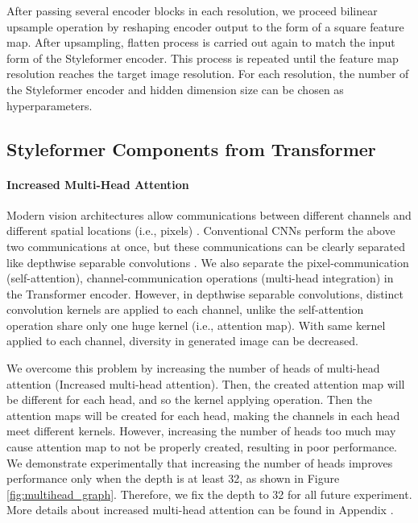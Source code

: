 \documentclass[10pt,twocolumn,letterpaper]{article}
\begin{document}
After passing several encoder blocks in each resolution, we proceed bilinear upsample operation by reshaping encoder output to the form of a square feature map. After upsampling, flatten process is carried out again to match the input form of the Styleformer encoder. This process is repeated until the feature map resolution reaches the target image resolution. For each resolution, the number of the Styleformer encoder and hidden dimension size can be chosen as hyperparameters.





\subsection{Styleformer Components from Transformer}
\label{section:3-2}





\paragraph{Increased Multi-Head Attention}


Modern vision architectures allow communications between different channels and different spatial locations (i.e., pixels) \cite{tolstikhin2021mlpmixer}. Conventional CNNs perform the above two communications at once, but these communications can be clearly separated like depthwise separable convolutions \cite{howard2017mobilenets}. We also separate the pixel-communication (self-attention), channel-communication operations (multi-head integration) in the Transformer encoder. However, in depthwise separable convolutions, distinct convolution kernels are applied to each channel, unlike the self-attention operation share only one huge kernel  (i.e., attention map). With same kernel applied to each channel, diversity in generated image can be decreased.


We overcome this problem by increasing the number of heads of multi-head attention (Increased multi-head attention). Then, the created attention map will be different for each head, and so the kernel applying operation. 
Then the attention maps will be created for each head, making the channels in each head meet different kernels.
However, increasing the number of heads too much may cause attention map to not be properly created, resulting in poor performance.
We demonstrate experimentally that increasing the number of heads improves performance only when the depth is at least 32, as shown in Figure \ref{fig:multihead_graph}. Therefore, we fix the depth to 32 for all future experiment.  More details about increased multi-head attention can be found in Appendix . 
\end{document}
